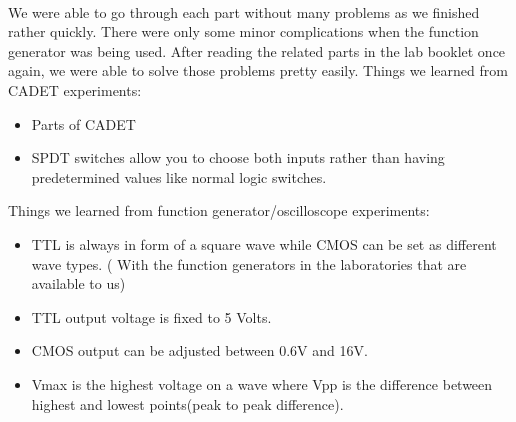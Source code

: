 \documentclass[pdftex,12pt,a4paper]{article}
\begin{document}
\begin{flushleft}
\paragraph{}
We were able to go through each part without many problems as we finished rather quickly. There were only some minor complications when the function generator was being used. After reading the related parts in the lab booklet once again, we were able to solve those problems pretty easily.  
\newline
Things we learned from CADET experiments:
\begin{itemize}
    \item Parts of CADET
    \item SPDT switches allow you to choose both inputs rather than having predetermined values like normal logic switches.
\end{itemize}


    Things we learned from function generator/oscilloscope experiments:
\begin{itemize}
    \item TTL is always in form of a square wave while CMOS can be set as different wave types. ( With the function generators in the laboratories that are available to us)
    \item TTL output voltage is fixed to 5 Volts.
    \item CMOS output can be adjusted between 0.6V and 16V.
    \item Vmax is the highest voltage on a wave where Vpp is the difference between highest and lowest points(peak to peak difference). 
    
\end{itemize}
\end{flushleft}

\newpage
{}



\end{document}
